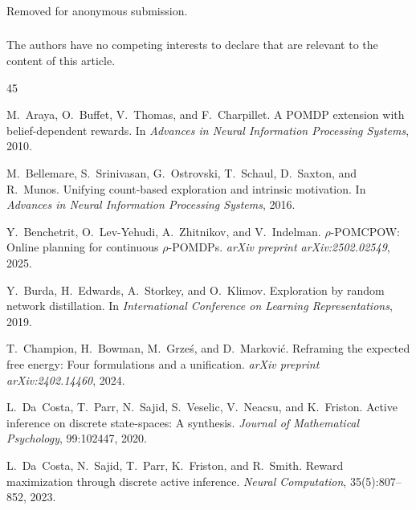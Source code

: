 \documentclass[runningheads]{llncs}
\begin{document}
\begin{credits}
\subsubsection{\ackname} Removed for anonymous submission.

\subsubsection{\discintname}
The authors have no competing interests to declare that are relevant to the content of this article.
\end{credits}

\begin{thebibliography}{45}

M.~Araya, O.~Buffet, V.~Thomas, and F.~Charpillet.
\newblock A {POMDP} extension with belief-dependent rewards.
\newblock In \emph{Advances in Neural Information Processing Systems}, 2010.

M.~Bellemare, S.~Srinivasan, G.~Ostrovski, T.~Schaul, D.~Saxton, and R.~Munos.
\newblock Unifying count-based exploration and intrinsic motivation.
\newblock In \emph{Advances in Neural Information Processing Systems}, 2016.

Y.~Benchetrit, O.~Lev-Yehudi, A.~Zhitnikov, and V.~Indelman.
\newblock $\rho$-{POMCPOW}: Online planning for continuous $\rho$-{POMDP}s.
\newblock \emph{arXiv preprint arXiv:2502.02549}, 2025.

Y.~Burda, H.~Edwards, A.~Storkey, and O.~Klimov.
\newblock Exploration by random network distillation.
\newblock In \emph{International Conference on Learning Representations}, 2019.

T.~Champion, H.~Bowman, M.~Grze\'{s}, and D.~Markovi\'{c}.
\newblock Reframing the expected free energy: Four formulations and a unification.
\newblock \emph{arXiv preprint arXiv:2402.14460}, 2024.

L.~Da~Costa, T.~Parr, N.~Sajid, S.~Veselic, V.~Neacsu, and K.~Friston.
\newblock Active inference on discrete state-spaces: A synthesis.
\newblock \emph{Journal of Mathematical Psychology}, 99:102447, 2020.

L.~Da~Costa, N.~Sajid, T.~Parr, K.~Friston, and R.~Smith.
\newblock Reward maximization through discrete active inference.
\newblock \emph{Neural Computation}, 35(5):807--852, 2023.


\end{thebibliography}
\end{document}
